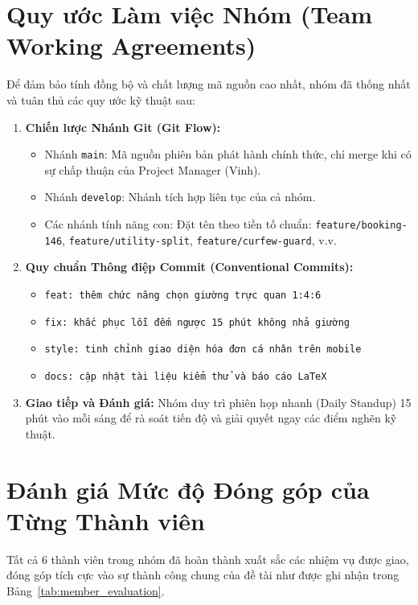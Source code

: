 \section{Quy ước Làm việc Nhóm (Team Working Agreements)}
Để đảm bảo tính đồng bộ và chất lượng mã nguồn cao nhất, nhóm đã thống nhất và tuân thủ các quy ước kỹ thuật sau:
\begin{enumerate}
    \item \textbf{Chiến lược Nhánh Git (Git Flow):}
    \begin{itemize}
        \item Nhánh \texttt{main}: Mã nguồn phiên bản phát hành chính thức, chỉ merge khi có sự chấp thuận của Project Manager (Vinh).
        \item Nhánh \texttt{develop}: Nhánh tích hợp liên tục của cả nhóm.
        \item Các nhánh tính năng con: Đặt tên theo tiền tố chuẩn: \texttt{feature/booking-146}, \texttt{feature/utility-split}, \texttt{feature/curfew-guard}, v.v.
    \end{itemize}
    \item \textbf{Quy chuẩn Thông điệp Commit (Conventional Commits):}
    \begin{itemize}
        \item \texttt{feat: thêm chức năng chọn giường trực quan 1:4:6}
        \item \texttt{fix: khắc phục lỗi đếm ngược 15 phút không nhả giường}
        \item \texttt{style: tinh chỉnh giao diện hóa đơn cá nhân trên mobile}
        \item \texttt{docs: cập nhật tài liệu kiểm thử và báo cáo LaTeX}
    \end{itemize}
    \item \textbf{Giao tiếp và Đánh giá:} Nhóm duy trì phiên họp nhanh (Daily Standup) 15 phút vào mỗi sáng để rà soát tiến độ và giải quyết ngay các điểm nghẽn kỹ thuật.
\end{enumerate}

\section{Đánh giá Mức độ Đóng góp của Từng Thành viên}
Tất cả 6 thành viên trong nhóm đã hoàn thành xuất sắc các nhiệm vụ được giao, đóng góp tích cực vào sự thành công chung của đề tài như được ghi nhận trong Bảng~\ref{tab:member_evaluation}.

